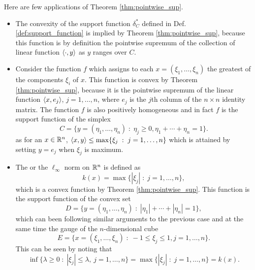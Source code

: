 \documentclass[11pt,a4paper]{article}
\begin{document}
\begin{remark}
    Here are few applications of Theorem \ref{thm:pointwise_sup}.
    \begin{itemize}
        \item The convexity of the support function $\delta^*_C$ defined in Def. \ref{def:support_function} is implied by Theorem \ref{thm:pointwise_sup}, because this function is by definition the pointwise supremum of the collection of linear function $\langle \cdot, y \rangle$ as $y$ ranges over $C$.
        \item Consider the function $f$ which assigns to each $x = (\xi_1,\ldots,\xi_n)$ the greatest of the components $\xi_i$ of $x$. This function is convex by Theorem \ref{thm:pointwise_sup}, because it is the pointwise supremum of the linear function $\langle x, e_j \rangle$, $j = 1,\ldots,n$, where $e_j$ is the $j$th column of the $n\times n$ identity matrix. The function $f$ is also positively homogeneous and in fact $f$ is the support function of the simplex
        \begin{equation*}
            C = \{y = (\eta_1,\ldots,\eta_n)\;:\;\eta_j\ge 0,\eta_1+\cdots+\eta_n = 1\}.
        \end{equation*}
        as for an $x\in \mathbb{R}^n$, $\langle x, y \rangle\le \max \{\xi_j\;:\;j=1,\ldots,n\}$ which is attained by setting $y = e_j$ when $\xi_j$ is maximum.
        \item The  or the $\ell_{\infty}$ norm on $\mathbb{R}^n$ is defined as
        \begin{equation*}
            k(x) = \max \{|\xi_j|\;:\;j = 1,\ldots,n\},
        \end{equation*}
        which is a convex function by Theorem \ref{thm:pointwise_sup}. This function is the support function of the convex set 
        \begin{equation*}
            D = \{y=(\eta_1,\ldots,\eta_n)\;:\; |\eta_1|+\cdots+|\eta_n| = 1\},
        \end{equation*}
        which can been following similar arguments to the previous case and at the same time the gauge of the $n$-dimensional cube 
        \begin{equation*}
            E = \{x = (\xi_1,\ldots,\xi_n)\;:\;-1\le \xi_j\le 1, j = 1,\ldots,n\}.
        \end{equation*}
        This can be seen by noting that 
        \begin{equation*}
            \inf \{\lambda\ge 0\;:\;|\xi_j|\le \lambda,\ j = 1,\ldots,n\} = \max \{|\xi_j|\;:\;j=1,\ldots,n\} = k(x).
        \end{equation*}
    \end{itemize}
\end{remark}
\end{document}
